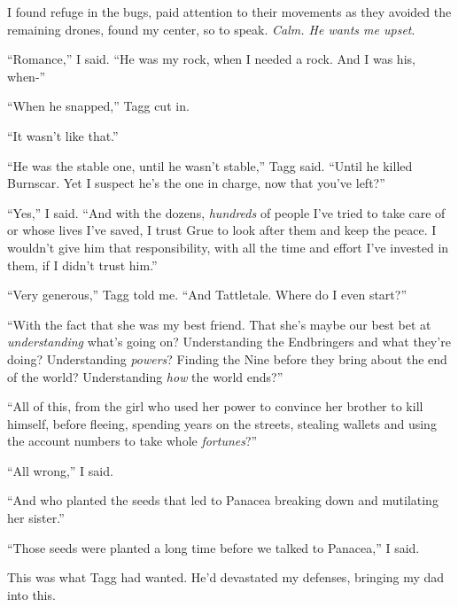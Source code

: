 I found refuge in the bugs, paid attention to their movements as they avoided the remaining drones, found my center, so to speak.  \emph{Calm.  He wants me upset}.



``Romance,'' I said.  ``He was my rock, when I needed a rock.  And I was his, when-''



``When he snapped,'' Tagg cut in.



``It wasn't like that.''



``He was the stable one, until he wasn't stable,'' Tagg said.  ``Until he killed Burnscar.  Yet I suspect he's the one in charge, now that you've left?''



``Yes,'' I said.  ``And with the dozens, \emph{hundreds} of people I've tried to take care of or whose lives I've saved, I trust Grue to look after them and keep the peace.  I wouldn't give him that responsibility, with all the time and effort I've invested in them, if I didn't trust him.''



``Very generous,'' Tagg told me.  ``And Tattletale.  Where do I even start?''



``With the fact that she was my best friend.  That she's maybe our best bet at \emph{understanding} what's going on?  Understanding the Endbringers and what they're doing?  Understanding \emph{powers}?  Finding the Nine before they bring about the end of the world?  Understanding \emph{how} the world ends?''



``All of this, from the girl who used her power to convince her brother to kill himself, before fleeing, spending years on the streets, stealing wallets and using the account numbers to take whole \emph{fortunes}?''



``All wrong,'' I said.



``And who planted the seeds that led to Panacea breaking down and mutilating her sister.''



``Those seeds were planted a long time before we talked to Panacea,'' I said.



This was what Tagg had wanted.  He'd devastated my defenses, bringing my dad into this.



